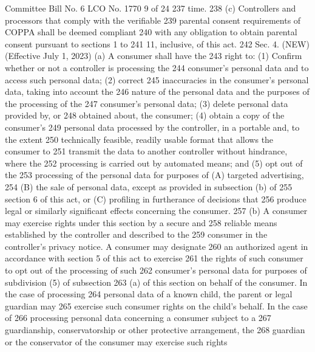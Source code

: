 Committee Bill No. 6
LCO No. 1770 9 of 24
237 time.
238 (c) Controllers and processors that comply with the verifiable
239 parental consent requirements of COPPA shall be deemed compliant
240 with any obligation to obtain parental consent pursuant to sections 1 to
241 11, inclusive, of this act.
242 Sec. 4. (NEW) (Effective July 1, 2023) (a) A consumer shall have the
243 right to: (1) Confirm whether or not a controller is processing the
244 consumer's personal data and to access such personal data; (2) correct
245 inaccuracies in the consumer's personal data, taking into account the
246 nature of the personal data and the purposes of the processing of the
247 consumer's personal data; (3) delete personal data provided by, or
248 obtained about, the consumer; (4) obtain a copy of the consumer's
249 personal data processed by the controller, in a portable and, to the extent
250 technically feasible, readily usable format that allows the consumer to
251 transmit the data to another controller without hindrance, where the
252 processing is carried out by automated means; and (5) opt out of the
253 processing of the personal data for purposes of (A) targeted advertising,
254 (B) the sale of personal data, except as provided in subsection (b) of
255 section 6 of this act, or (C) profiling in furtherance of decisions that
256 produce legal or similarly significant effects concerning the consumer.
257 (b) A consumer may exercise rights under this section by a secure and
258 reliable means established by the controller and described to the
259 consumer in the controller's privacy notice. A consumer may designate
260 an authorized agent in accordance with section 5 of this act to exercise
261 the rights of such consumer to opt out of the processing of such
262 consumer's personal data for purposes of subdivision (5) of subsection
263 (a) of this section on behalf of the consumer. In the case of processing
264 personal data of a known child, the parent or legal guardian may
265 exercise such consumer rights on the child's behalf. In the case of
266 processing personal data concerning a consumer subject to a
267 guardianship, conservatorship or other protective arrangement, the
268 guardian or the conservator of the consumer may exercise such rights 


